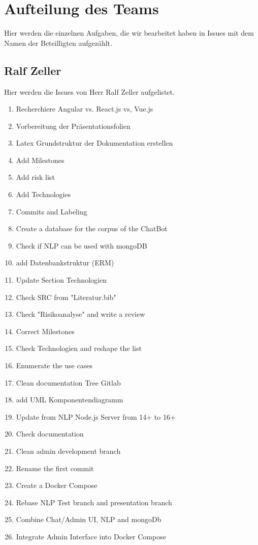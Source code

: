 \section{Aufteilung des Teams}
Hier werden die einzelnen Aufgaben, die wir bearbeitet haben in Issues mit dem Namen der Beteilligten aufgezählt.

\subsection{Ralf Zeller}
Hier werden die Issues von Herr Ralf Zeller aufgelistet.
\begin{enumerate}
\item Recherchiere Angular vs. React.js vs, Vue.js
\item Vorbereitung der Präsentationsfolien
\item Latex Grundstruktur der Dokumentation erstellen
\item Add Milestones
\item Add risk list
\item Add Technologies
\item Commits and Labeling
\item Create a database for the corpus of the ChatBot
\item Check if NLP can be used with mongoDB
\item add Datenbankstruktur (ERM)
\item Update Section Technologien
\item Check SRC from "Literatur.bib"
\item Check "Risikoanalyse" and write a review
\item Correct Milestones
\item Check Technologien and reshape the list
\item Enumerate the use cases
\item Clean documentation Tree Gitlab
\item add UML Komponentendiagramm
\item Update from NLP Node.js Server from 14+ to 16+
\item Check documentation
\item Clean admin development branch
\item Rename the first commit
\item Create a Docker Compose
\item Rebase NLP Test branch and presentation branch
\item Combine Chat/Admin UI, NLP and mongoDb
\item Integrate Admin Interface into Docker Compose

\end{enumerate}
